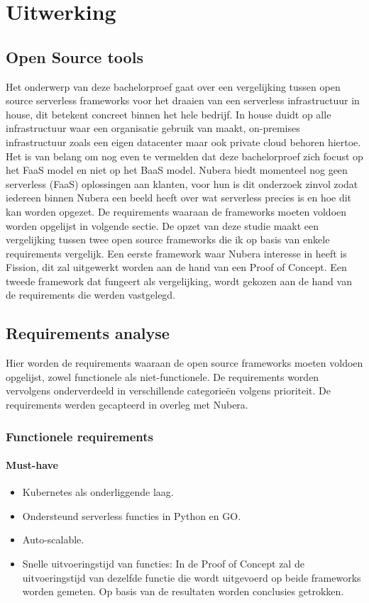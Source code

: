 \chapter{Uitwerking}
\label{ch:uitwerking}
\section{Open Source tools}
Het onderwerp van deze bachelorproef gaat over een vergelijking tussen open source serverless frameworks voor het draaien van een serverless infrastructuur in house, dit betekent concreet binnen het hele bedrijf. In house duidt op alle infrastructuur waar een organisatie gebruik van maakt, on-premises infrastructuur zoals een eigen datacenter maar ook private cloud behoren hiertoe. Het is van belang om nog even te vermelden dat deze bachelorproef zich focust op het FaaS model en niet op het BaaS model. Nubera biedt momenteel nog geen serverless (FaaS) oplossingen aan klanten, voor hun is dit onderzoek zinvol zodat iedereen binnen Nubera een beeld heeft over wat serverless precies is en hoe dit kan worden opgezet. De requirements waaraan de frameworks moeten voldoen worden opgelijst in volgende sectie. De opzet van deze studie maakt een vergelijking tussen twee open source frameworks die ik op basis van enkele requirements vergelijk. Een eerste framework waar Nubera interesse in heeft is Fission, dit zal uitgewerkt worden aan de hand van een Proof of Concept. Een tweede framework dat fungeert als vergelijking, wordt gekozen aan de hand van de requirements die werden vastgelegd.

\section{Requirements analyse}
Hier worden de requirements waaraan de open source frameworks moeten voldoen opgelijst, zowel functionele als niet-functionele. De requirements worden vervolgens onderverdeeld in verschillende categorieën volgens prioriteit. De requirements werden gecapteerd in overleg met Nubera.

\subsection{Functionele requirements}
\subsubsection{Must-have}
\begin{itemize}
    \item Kubernetes als onderliggende laag.
    \item Ondersteund serverless functies in Python en GO.
    \item Auto-scalable.
    \item Snelle uitvoeringstijd van functies: In de Proof of Concept zal de uitvoeringstijd van dezelfde functie die wordt uitgevoerd op beide frameworks worden gemeten. Op basis van de resultaten worden conclusies getrokken.
\end{itemize}
